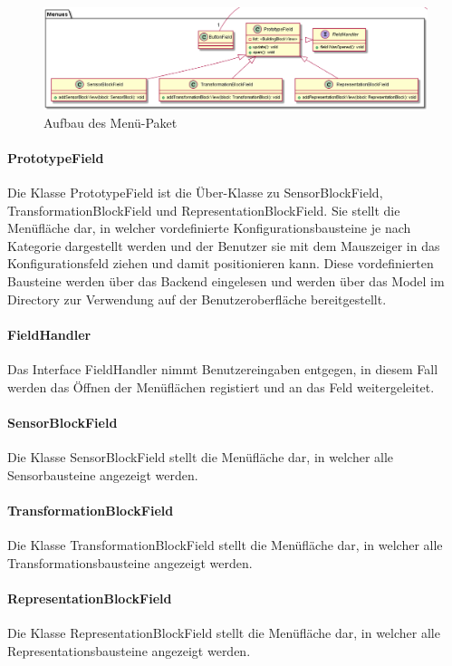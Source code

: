 \documentclass[parskip=full]{scrartcl}
\begin{document}
\begin{figure}[htbp]
	\begin{center}
		\includegraphics[width = 14cm]{Grafiken/View/MenuesNamespace.png}
		\caption{Aufbau des Menü-Paket}
		\label{Entwurf_Grob}
	\end{center}
\end{figure}

\paragraph{PrototypeField}
Die Klasse PrototypeField ist die Über-Klasse zu SensorBlockField, TransformationBlockField und RepresentationBlockField. 
Sie stellt die Menüfläche dar, in welcher vordefinierte Konfigurationsbausteine je nach Kategorie dargestellt werden und der Benutzer sie mit dem Mauszeiger in das Konfigurationsfeld ziehen und damit positionieren kann. Diese vordefinierten Bausteine werden über das Backend eingelesen und werden über das Model im Directory zur Verwendung auf der Benutzeroberfläche bereitgestellt.

\paragraph{FieldHandler}
Das Interface FieldHandler nimmt Benutzereingaben entgegen, in diesem Fall werden das Öffnen der Menüflächen registiert und an das Feld weitergeleitet.

\paragraph{SensorBlockField}
Die Klasse SensorBlockField stellt die Menüfläche dar, in welcher alle Sensorbausteine angezeigt werden.

\paragraph{TransformationBlockField}
Die Klasse TransformationBlockField stellt die Menüfläche dar, in welcher alle Transformationsbausteine angezeigt werden.

\paragraph{RepresentationBlockField}
Die Klasse RepresentationBlockField stellt die Menüfläche dar, in welcher alle Representationsbausteine angezeigt werden.
\end{document}
